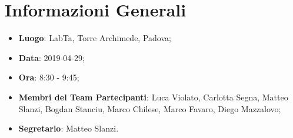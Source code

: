 \section{Informazioni Generali}
\begin{itemize}
	\item \textbf{Luogo}: LabTa, Torre Archimede, Padova; 
	\item \textbf{Data}: 2019-04-29;
	\item \textbf{Ora}: 8:30 - 9:45;
	\item \textbf{Membri del Team Partecipanti}: Luca Violato, Carlotta Segna, Matteo Slanzi, Bogdan Stanciu, Marco Chilese, Marco Favaro, Diego Mazzalovo; 
	\item \textbf{Segretario}: Matteo Slanzi. 
\end{itemize}


